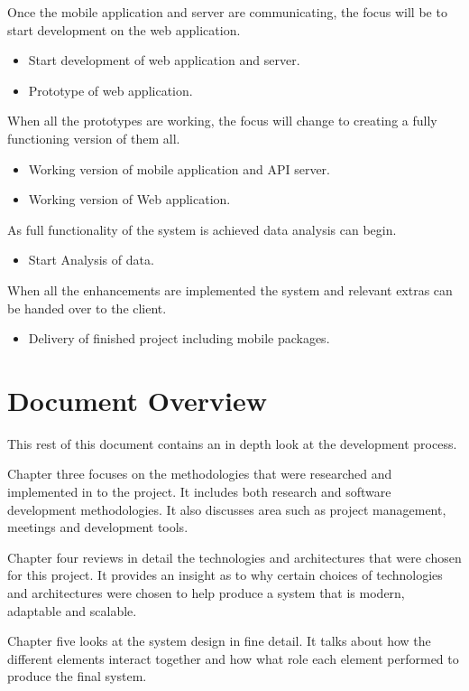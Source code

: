 Once the mobile application and server are communicating, the focus will be to start development on the web application.
\begin{itemize}
\item Start development of web application and server.
\item Prototype of web application. 
\end{itemize}	


When all the prototypes are working, the focus will change to creating a fully functioning version of them all.
\begin{itemize}
\item Working version of mobile application and API server.
\item Working version of Web application. 
\end{itemize}	


As full functionality of the system is achieved data analysis can begin.
\begin{itemize}
\item Start Analysis of data.
\end{itemize}


When all the enhancements are implemented the system and relevant extras can be handed over to the client.
\begin{itemize}
\item Delivery of finished project including mobile packages.
\end{itemize}
	
\section{Document Overview}
This rest of this document contains an in depth look at the development process.

Chapter three focuses on the methodologies that were researched and implemented in to the project. It includes both research and software development methodologies. It also discusses area such as project management, meetings and development tools.

Chapter four reviews in detail the technologies and architectures that were chosen for this project. It provides an insight as to why certain choices of technologies and architectures were chosen to help produce a system that is modern, adaptable and scalable.

Chapter five looks at the system design in fine detail. It talks about how the different elements interact together and how what role each element performed to produce the final system.

